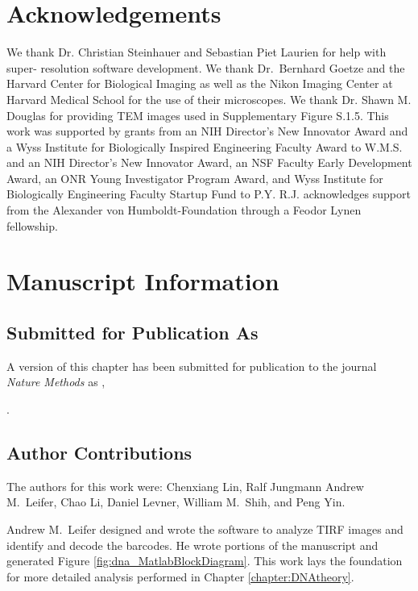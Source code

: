 \section{Acknowledgements}
We thank Dr. Christian Steinhauer and Sebastian Piet Laurien for help with super- 
resolution software development. We thank Dr.~Bernhard Goetze and the Harvard Center 
for Biological Imaging as well as the Nikon Imaging Center at Harvard Medical School 
for the use of their microscopes. We thank Dr. Shawn M. Douglas for providing TEM 
images used in Supplementary Figure S.1.5. This work was supported by grants from an NIH Director’s New 
Innovator Award and a Wyss Institute for Biologically Inspired Engineering Faculty 
Award to W.M.S. and an NIH Director’s New Innovator Award, an NSF Faculty Early 
Development Award, an ONR Young Investigator Program Award, and Wyss Institute 
for Biologically Engineering Faculty Startup Fund to P.Y. R.J. acknowledges support 
from the Alexander von Humboldt-Foundation through a Feodor Lynen fellowship.





\section{Manuscript Information}
\subsection{Submitted for Publication As}
A version of this chapter has been submitted for publication to the journal \textit{Nature Methods}  as \citep{lin_sub-micrometer_2011},

.

\subsection{Author Contributions}
The authors for this work were: Chenxiang Lin, Ralf Jungmann  Andrew M.~Leifer,  Chao Li,  Daniel Levner,  William M.~Shih,  and Peng Yin.


Andrew M.~Leifer designed and wrote the software to analyze TIRF images and identify and decode the barcodes. He wrote portions of the manuscript and generated Figure \ref{fig:dna_MatlabBlockDiagram}. This work lays the foundation for more detailed analysis performed in Chapter \ref{chapter:DNAtheory}.


